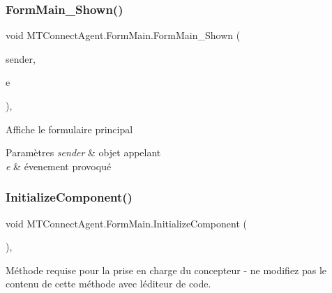 \subsubsection{\texorpdfstring{Form\+Main\+\_\+\+Shown()}{FormMain\_Shown()}}
{\footnotesize\ttfamily void M\+T\+Connect\+Agent.\+Form\+Main.\+Form\+Main\+\_\+\+Shown (\begin{DoxyParamCaption}\item[{object}]{sender,  }\item[{Event\+Args}]{e }\end{DoxyParamCaption})\hspace{0.3cm}{\ttfamily [inline]}, {\ttfamily [private]}}



Affiche le formulaire principal 


\begin{DoxyParams}{Paramètres}
{\em sender} & objet appelant\\
\hline
{\em e} & évenement provoqué\\
\hline
\end{DoxyParams}
\mbox{\label{class_m_t_connect_agent_1_1_form_main_adcf40eec3a3bf56148d6cd5fbdeda2c5}} 
\subsubsection{\texorpdfstring{Initialize\+Component()}{InitializeComponent()}}
{\footnotesize\ttfamily void M\+T\+Connect\+Agent.\+Form\+Main.\+Initialize\+Component (\begin{DoxyParamCaption}{ }\end{DoxyParamCaption})\hspace{0.3cm}{\ttfamily [inline]}, {\ttfamily [private]}}



Méthode requise pour la prise en charge du concepteur -\/ ne modifiez pas le contenu de cette méthode avec l\textquotesingle{}éditeur de code. 

\mbox{\label{class_m_t_connect_agent_1_1_form_main_a90b43ceba6da9143b98ded12f0d31a5e}} 
